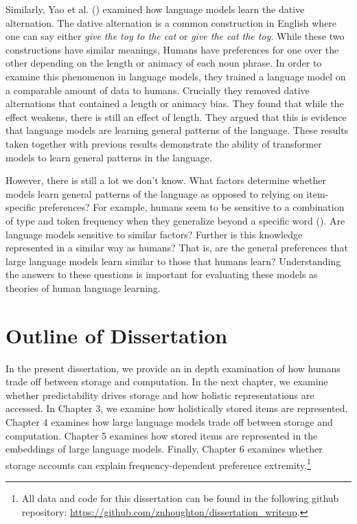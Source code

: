 \documentclass[
  12pt,
  letterpaper,
]{scrreport}
\begin{document}
Similarly, Yao et al. ()
examined how language models learn the dative alternation. The dative
alternation is a common construction in English where one can say either
\emph{give the toy to the cat} or \emph{give the cat the toy}. While
these two constructions have similar meanings, Humans have preferences
for one over the other depending on the length or animacy of each noun
phrase. In order to examine this phenomenon in language models, they
trained a language model on a comparable amount of data to humans.
Crucially they removed dative alternations that contained a length or
animacy bias. They found that while the effect weakens, there is still
an effect of length. They argued that this is evidence that language
models are learning general patterns of the language. These results
taken together with previous results demonstrate the ability of
transformer models to learn general patterns in the language.

However, there is still a lot we don't know. What factors determine
whether models learn general patterns of the language as opposed to
relying on item-specific preferences? For example, humans seem to be
sensitive to a combination of type and token frequency when they
generalize beyond a specific word
().
Are language models sensitive to similar factors? Further is this
knowledge represented in a similar way as humans? That is, are the
general preferences that large language models learn similar to those
that humans learn? Understanding the answers to these questions is
important for evaluating these models as theories of human language
learning.

\section{Outline of Dissertation}\label{sec-outline-of-dissertation}

In the present dissertation, we provide an in depth examination of how
humans trade off between storage and computation. In the next chapter,
we examine whether predictability drives storage and how holistic
representations are accessed. In Chapter 3, we examine how holistically
stored items are represented. Chapter 4 examines how large language
models trade off between storage and computation. Chapter 5 examines how
stored items are represented in the embeddings of large language models.
Finally, Chapter 6 examines whether storage accounts can explain
frequency-dependent preference extremity.\footnote{All data and code for
  this dissertation can be found in the following github repository:
  \url{https://github.com/znhoughton/dissertation_writeup}.}
\end{document}
